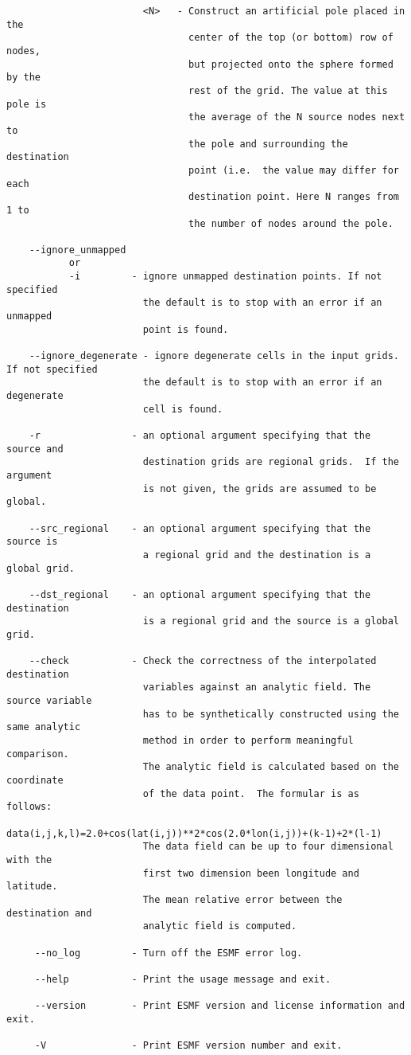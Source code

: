 \begin{verbatim}
                        <N>   - Construct an artificial pole placed in the
                                center of the top (or bottom) row of nodes,
                                but projected onto the sphere formed by the
                                rest of the grid. The value at this pole is
                                the average of the N source nodes next to
                                the pole and surrounding the destination
                                point (i.e.  the value may differ for each
                                destination point. Here N ranges from 1 to
                                the number of nodes around the pole.

    --ignore_unmapped
           or
           -i         - ignore unmapped destination points. If not specified
                        the default is to stop with an error if an unmapped
                        point is found.

    --ignore_degenerate - ignore degenerate cells in the input grids. If not specified
                        the default is to stop with an error if an degenerate
                        cell is found.

    -r                - an optional argument specifying that the source and
                        destination grids are regional grids.  If the argument
                        is not given, the grids are assumed to be global.

    --src_regional    - an optional argument specifying that the source is
                        a regional grid and the destination is a global grid.

    --dst_regional    - an optional argument specifying that the destination
                        is a regional grid and the source is a global grid.

    --check           - Check the correctness of the interpolated destination 
                        variables against an analytic field. The source variable 
                        has to be synthetically constructed using the same analytic
                        method in order to perform meaningful comparison.
                        The analytic field is calculated based on the coordinate
                        of the data point.  The formular is as follows:
                        data(i,j,k,l)=2.0+cos(lat(i,j))**2*cos(2.0*lon(i,j))+(k-1)+2*(l-1)
                        The data field can be up to four dimensional with the
                        first two dimension been longitude and latitude.
                        The mean relative error between the destination and 
                        analytic field is computed.

     --no_log         - Turn off the ESMF error log.

     --help           - Print the usage message and exit.

     --version        - Print ESMF version and license information and exit.

     -V               - Print ESMF version number and exit.
\end{verbatim}



